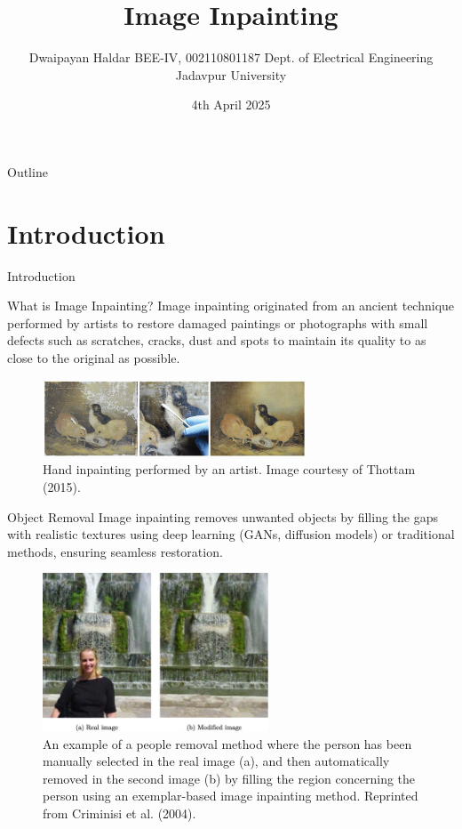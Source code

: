 \documentclass{beamer}
\title{Image Inpainting}
\author{Dwaipayan Haldar \protect\linebreak BEE-IV, 002110801187 \protect\linebreak Dept. of Electrical Engineering \protect\linebreak Jadavpur University}
\date{4th April 2025}
\begin{document}
\begin{frame}
    \titlepage
\end{frame}

\begin{frame}{Outline}
    \tableofcontents
\end{frame}

\section{Introduction}

\begin{frame}{}
    \centering
    \Huge{Introduction}
\end{frame}

\begin{frame}{What is Image Inpainting?}
     Image inpainting originated from an ancient technique performed
 by artists to restore damaged paintings or photographs with small
 defects such as scratches, cracks, dust and spots to maintain its quality
 to as close to the original as possible.
    \begin{figure}[h]
        \centering
        \includegraphics[width=0.7\textwidth]{ArtResto-1024x301.jpg} %
        \caption{ Hand inpainting performed by an artist. Image courtesy of Thottam (2015).}
    \end{figure}
\end{frame}

\begin{frame}{Object Removal}
     Image inpainting removes unwanted objects by filling the gaps with realistic textures using deep learning (GANs, diffusion models) or traditional methods, ensuring seamless restoration.
    \begin{figure}[h]
        \centering
        \includegraphics[width=0.6\textwidth]{Object Removal.jpg} %
        \caption{ An example of a people removal method where the person has been manually selected in the real image (a), and then automatically removed in the second image (b) by filling the region concerning the person using an exemplar-based image inpainting method. Reprinted from Criminisi et al. (2004).}
    \end{figure}
\end{frame}
\end{document}
